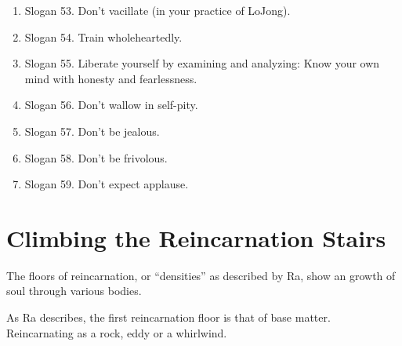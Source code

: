 \begin{enumerate}
\begin{enumerate}
        \item Slogan 53. Don't vacillate (in your practice of LoJong).
        \item Slogan 54. Train wholeheartedly.
        \item Slogan 55. Liberate yourself by examining and analyzing: Know your own mind with honesty and fearlessness.
        \item Slogan 56. Don't wallow in self-pity.
        \item Slogan 57. Don't be jealous.
        \item Slogan 58. Don't be frivolous.
        \item Slogan 59. Don't expect applause.
      \end{enumerate}
\end{enumerate}



\chapter{Climbing the Reincarnation Stairs}\label{chapter:climbing}
The floors of reincarnation, or ``densities'' as described by Ra, show an growth
of soul through various bodies. 


As Ra describes, the first reincarnation floor is that of base matter.
Reincarnating as a rock, eddy or a whirlwind. 

